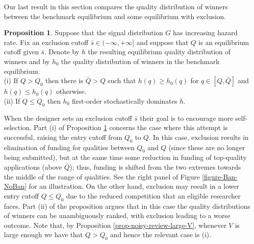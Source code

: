 \documentclass[12pt]{article}
\theoremstyle{plain}
\theoremstyle{definition}
\newtheorem{proposition}{Proposition}
\theoremstyle{remark}
\begin{document}
Our last result in this section compares the quality distribution of winners between the benchmark equilibrium and some equilibrium with exclusion.  

\begin{proposition}\label{prop-noisy-review-comparison}
Suppose that the signal distribution $G$ has increasing hazard rate. Fix an exclusion cutoff $\bar s\in (-\infty,+\infty]$ and suppose that $Q$ is an equilibrium cutoff given $\bar s$. Denote by $h$ the resulting equilibrium quality distribution of winners and by $h_0$ the quality distribution of winners in the benchmark equilibrium.\\
(i) If $Q>Q_0$ then there is $\bar Q>Q$ such that $h(q)\ge h_0(q)$ for $q\in[Q,\bar Q]$ and $h(q)\le h_0(q)$ otherwise.\\
(ii) If $Q\le Q_0$ then $h_0$ first-order stochastically dominates $h$.
\end{proposition}

When the designer sets an exclusion cutoff $\bar s$ their goal is to encourage more self-selection. Part (i) of Proposition \ref{prop-noisy-review-comparison} concerns the case where this attempt is successful, raising the entry cutoff from $Q_0$ to $Q$. In this case, exclusion results in elimination of funding for qualities between $Q_0$ and $Q$ (since these are no longer being submitted), but at the same time some reduction in funding of top-quality applications (above $\bar Q$); thus, funding is shifted from the two extremes towards the middle of the range of qualities. See the right panel of Figure \ref{figure-Ban-NoBan} for an illustration. On the other hand, exclusion may result in a lower entry cutoff $Q\le Q_0$ due to the reduced competition that an eligible researcher faces. Part (ii) of the proposition argues that in this case the quality distributions of winners can be unambiguously ranked, with exclusion leading to a worse outcome. Note that, by Proposition \ref{prop-noisy-review-large-V}, whenever $V$ is large enough we have that $Q>Q_0$ and hence the relevant case is (i).

\end{document}
